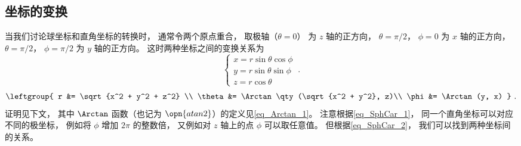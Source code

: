 

\subsection{坐标的变换}
当我们讨论球坐标和直角坐标的转换时， 通常令两个原点重合， 取极轴（$\theta = 0$） 为 $z$ 轴的正方向， $\theta = \pi/2$， $\phi = 0$ 为 $x$ 轴的正方向， $\theta = \pi/2$， $\phi = \pi/2$ 为 $y$ 轴的正方向。 这时两种坐标之间的变换关系为
\begin{equation}\label{eq_SphCar_1}
\begin{cases}
x = r\sin \theta \cos \phi \\
y = r\sin \theta \sin \phi \\
z = r\cos \theta 
\end{cases}~.
\end{equation}
\begin{equation}\label{eq_SphCar_2}
\leftgroup{
r &= \sqrt {x^2 + y^2 + z^2} \\
\theta  &= \Arctan\qty(\sqrt{x^2 + y^2}, z)\\
\phi  &= \Arctan(y, x)
}~.\end{equation}
证明见下文， 其中 $\Arctan$ 函数（也记为 $\opn{atan2}$）的定义见\autoref{eq_Arctan_1}。 注意根据\autoref{eq_SphCar_1}， 同一个直角坐标可以对应不同的极坐标， 例如将 $\phi$ 增加 $2\pi$ 的整数倍， 又例如对 $z$ 轴上的点 $\phi$ 可以取任意值。 但根据\autoref{eq_SphCar_2}， 我们可以找到两种坐标间的关系。

